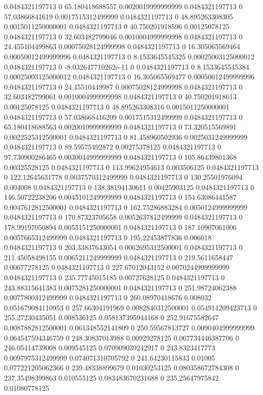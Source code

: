0.0484321197713 0 65.180418688557 0.0020019999999999
0.0484321197713 0 57.03866841619 0.0017515312499999
0.0484321197713 0 48.895263308305 0.0015011250000001
0.0484321197713 0 40.750201918596 0.00125078125
0.0484321197713 0 32.603482799046 0.0010004999999998
0.0484321197713 0 24.455104499863 0.00075028124999998
0.0484321197713 0 16.305065569464 0.00050012499999996
0.0484321197713 0 8.1533645545325 0.00025003125000012
0.0484321197713 0 -8.032647710262e-11 0
0.0484321197713 0 8.1533645545384 0.00025003125000012
0.0484321197713 0 16.305065569477 0.00050012499999996
0.0484321197713 0 24.45510449987 0.00075028124999998
0.0484321197713 0 32.603482799061 0.0010004999999998
0.0484321197713 0 40.750201918613 0.00125078125
0.0484321197713 0 48.895263308316 0.0015011250000001
0.0484321197713 0 57.038668416209 0.0017515312499999
0.0484321197713 0 65.180418688563 0.0020019999999999
0.0484321197713 0 73.320515569891 0.0022525312500001
0.0484321197713 0 81.458960502936 0.0025031249999999
0.0484321197713 0 89.59575492872 0.00275378125
0.0484321197713 0 97.730900286465 0.0030044999999999
0.0484321197713 0 105.86439801368 0.00325528125
0.0484321197713 0 113.99624954613 0.003506125
0.0484321197713 0 122.12645631778 0.0037570312499999
0.0484321197713 0 130.25501976094 0.004008
0.0484321197713 0 138.38194130611 0.00425903125
0.0484321197713 0 146.50722238206 0.0045101249999999
0.0484321197713 0 154.63086441587 0.0047612812500001
0.0484321197713 0 162.75286883284 0.0050124999999999
0.0484321197713 0 170.87323705658 0.0052637812499999
0.0484321197713 0 178.99197050894 0.0055151250000001
0.0484321197713 0 187.10907061006 0.0057665312499999
0.0484321197713 0 195.22453877836 0.006018
0.0484321197713 0 203.33837643054 0.0062695312500001
0.0484321197713 0 211.45058498155 0.0065211249999999
0.0484321197713 0 219.5611658447 0.00677278125
0.0484321197713 0 227.67012043152 0.0070244999999999
0.0484321197713 0 235.77745015185 0.00727628125
0.0484321197713 0 243.88315641383 0.0075281250000001
0.0484321197713 0 251.98724062388 0.0077800312499999
0.0484321197713 0 260.08970418676 0.008032
0.051679084110953 0 257.66304191969 0.0082840312500001
0.054914209423713 0 255.27230435051 0.008536125
0.058137395944168 0 252.91675582647 0.0087882812500001
0.061348552141809 0 250.59567813727 0.0090404999999999
0.064547594346759 0 248.30837013988 0.00929278125
0.067734446387706 0 246.05414739008 0.009545125
0.070909039242917 0 243.8323417773 0.0097975312499999
0.074071310705792 0 241.64230115833 0.01005
0.077221205062366 0 239.48338899679 0.01030253125
0.080358672784308 0 237.35498399863 0.010555125
0.083483670231688 0 235.25647975842 0.01080778125
